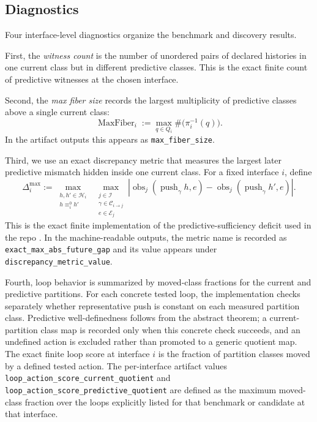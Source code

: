 \documentclass[11pt]{article}
\newcommand{\CurrentQ}{Q}
\newcommand{\Histories}{\mathcal{H}}
\newcommand{\Interfaces}{\mathcal{I}}
\newcommand{\CurrentEquiv}{\equiv^{0}}
\theoremstyle{definition}
\begin{document}
\subsection{Diagnostics}\label{subsec:eff-diagnostics}
Four interface-level diagnostics organize the benchmark and discovery results.

First, the \emph{witness count} is the number of unordered pairs of declared histories in one current class but in different predictive classes. This is the exact finite count of predictive witnesses at the chosen interface.

Second, the \emph{max fiber size} records the largest multiplicity of predictive classes above a single current class:
\begin{equation}
\operatorname{MaxFiber}_i
:=
\max_{q\in\CurrentQ_i}
\#\bigl(\pi_i^{-1}(q)\bigr).
\label{eq:max-fiber}
\end{equation}
In the artifact outputs this appears as \texttt{max\_fiber\_size}.

Third, we use an exact discrepancy metric that measures the largest later predictive mismatch hidden inside one current class. For a fixed interface $i$, define
\begin{equation}
\Delta_i^{\max}
:=
\max_{\substack{h,h'\in\Histories_i\\ h \CurrentEquiv_i h'}}
\;
\max_{\substack{j\in\Interfaces\\ \gamma\in\mathcal{C}_{i\to j}\\ e\in\mathcal{E}_j}}
\left|
\operatorname{obs}_j(\operatorname{push}_{\gamma} h,e)
-
\operatorname{obs}_j(\operatorname{push}_{\gamma} h',e)
\right|.
\label{eq:exact-max-gap}
\end{equation}
This is the exact finite implementation of the predictive-sufficiency deficit used in the repo \citep{Tsiokos2026CastStone}. In the machine-readable outputs, the metric name is recorded as \texttt{exact\_max\_abs\_future\_gap} and its value appears under \texttt{discrepancy\_metric\_value}.

Fourth, loop behavior is summarized by moved-class fractions for the current and predictive partitions. For each concrete tested loop, the implementation checks separately whether representative push is constant on each measured partition class. Predictive well-definedness follows from the abstract theorem; a current-partition class map is recorded only when this concrete check succeeds, and an undefined action is excluded rather than promoted to a generic quotient map. The exact finite loop score at interface $i$ is the fraction of partition classes moved by a defined tested action. The per-interface artifact values
\texttt{loop\_action\_score\_current\_quotient}
and
\texttt{loop\_action\_score\_predictive\_quotient}
are defined as the maximum moved-class fraction over the loops explicitly listed for that benchmark or candidate at that interface.
\end{document}

